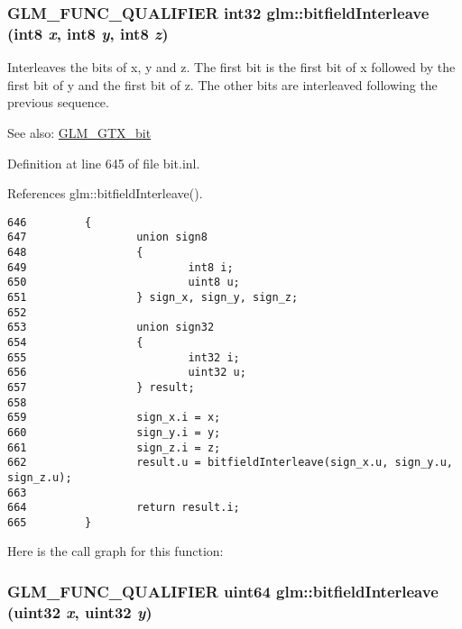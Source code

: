 \hypertarget{group__gtx__bit_g6dee2ce1c45805063bb7fc5f6fd8f5ca}{
\subsubsection[bitfieldInterleave]{\setlength{\rightskip}{0pt plus 5cm}GLM\_\-FUNC\_\-QUALIFIER int32 glm::bitfieldInterleave (int8 {\em x}, \/  int8 {\em y}, \/  int8 {\em z})}}
\label{group__gtx__bit_g6dee2ce1c45805063bb7fc5f6fd8f5ca}


Interleaves the bits of x, y and z. The first bit is the first bit of x followed by the first bit of y and the first bit of z. The other bits are interleaved following the previous sequence.

\begin{Desc}
\item[See also:]\hyperlink{group__gtx__bit}{GLM\_\-GTX\_\-bit} \end{Desc}


Definition at line 645 of file bit.inl.

References glm::bitfieldInterleave().

\begin{Code}\begin{verbatim}646         {
647                 union sign8
648                 {
649                         int8 i;
650                         uint8 u;
651                 } sign_x, sign_y, sign_z;
652 
653                 union sign32
654                 {
655                         int32 i;
656                         uint32 u;
657                 } result;
658 
659                 sign_x.i = x;
660                 sign_y.i = y;
661                 sign_z.i = z;
662                 result.u = bitfieldInterleave(sign_x.u, sign_y.u, sign_z.u);
663 
664                 return result.i;
665         }
\end{verbatim}
\end{Code}




Here is the call graph for this function:\hypertarget{group__gtx__bit_g2bc87fd66f6f8471c1a46888360cef12}{
\subsubsection[bitfieldInterleave]{\setlength{\rightskip}{0pt plus 5cm}GLM\_\-FUNC\_\-QUALIFIER uint64 glm::bitfieldInterleave (uint32 {\em x}, \/  uint32 {\em y})}}
\label{group__gtx__bit_g2bc87fd66f6f8471c1a46888360cef12}


